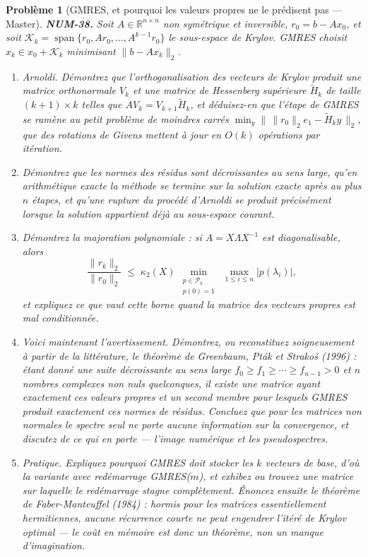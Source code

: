 \documentclass[11pt]{article}
\newtheorem{problem}{Problème}
\begin{document}
\bigskip

\begin{problem}[{GMRES, et pourquoi les valeurs propres ne le prédisent pas --- Master}]
\textbf{NUM-38.} Soit $A \in \mathbb{R}^{n\times n}$ non symétrique et inversible, $r_0 = b - Ax_0$, et soit
$\mathcal{K}_k = \operatorname{span}\{r_0, Ar_0, \ldots, A^{k-1}r_0\}$ le sous-espace de Krylov. GMRES choisit $x_k \in x_0 + \mathcal{K}_k$ minimisant $\|b - Ax_k\|_2$.
\begin{enumerate}
\item[(a)] Arnoldi. Démontrez que l'orthogonalisation des vecteurs de Krylov produit une matrice orthonormale $V_k$ et une matrice de Hessenberg supérieure $\tilde{H}_k$ de taille $(k+1)\times k$ telles que $A V_k = V_{k+1}\tilde{H}_k$, et déduisez-en que l'étape de GMRES se ramène au petit problème de moindres carrés $\min_y \big\|\, \|r_0\|_2 e_1 - \tilde{H}_k y \,\big\|_2$, que des rotations de Givens mettent à jour en $O(k)$ opérations par itération.
\item[(b)] Démontrez que les normes des résidus sont décroissantes au sens large, qu'en arithmétique exacte la méthode se termine sur la solution exacte après au plus $n$ étapes, et qu'une rupture du procédé d'Arnoldi se produit précisément lorsque la solution appartient déjà au sous-espace courant.
\item[(c)] Démontrez la majoration polynomiale : si $A = X\Lambda X^{-1}$ est diagonalisable, alors
\[ \frac{\|r_k\|_2}{\|r_0\|_2} \;\le\; \kappa_2(X)\,\min_{\substack{p \in \mathcal{P}_k \\ p(0) = 1}}\ \max_{1 \le i \le n} |p(\lambda_i)| , \]
et expliquez ce que vaut cette borne quand la matrice des vecteurs propres est mal conditionnée.
\item[(d)] Voici maintenant l'avertissement. Démontrez, ou reconstituez soigneusement à partir de la littérature, le théorème de Greenbaum, Pták et Strako\v{s} (1996) : étant donné une suite décroissante au sens large $f_0 \ge f_1 \ge \cdots \ge f_{n-1} > 0$ et $n$ nombres complexes non nuls quelconques, il existe une matrice ayant exactement ces valeurs propres et un second membre pour lesquels GMRES produit exactement ces normes de résidus. Concluez que pour les matrices non normales le spectre seul ne porte aucune information sur la convergence, et discutez de ce qui en porte --- l'image numérique et les pseudospectres.
\item[(e)] Pratique. Expliquez pourquoi GMRES doit stocker les $k$ vecteurs de base, d'où la variante avec redémarrage GMRES($m$), et exhibez ou trouvez une matrice sur laquelle le redémarrage stagne complètement. Énoncez ensuite le théorème de Faber-Manteuffel (1984) : hormis pour les matrices essentiellement hermitiennes, aucune récurrence courte ne peut engendrer l'itéré de Krylov optimal --- le coût en mémoire est donc un théorème, non un manque d'imagination.
\end{enumerate}

\end{problem}
\end{document}
